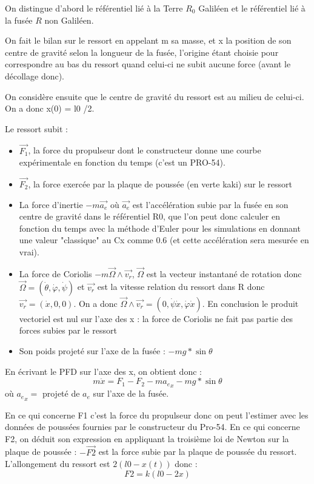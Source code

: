 \documentclass[a4paper,12pt]{scrartcl}
\begin{document}
On distingue d'abord le référentiel lié à la Terre $R_0$ Galiléen et le référentiel lié à la fusée $R$ non Galiléen.

On fait le bilan sur le ressort en appelant m sa masse, et x la position de son centre de gravité selon la longueur de la fusée, l'origine étant choisie pour correspondre au bas du ressort quand celui-ci ne subit aucune force (avant le décollage donc).

On considère ensuite que le centre de gravité du ressort est au milieu de celui-ci.
On a donc x(0) = l0 /2. 

Le ressort subit  : 
\begin{itemize}
\item $\vec{F_1}$, la force du propulseur dont le constructeur donne une courbe expérimentale en fonction du temps (c'est un PRO-54).
\item $\vec{F_2}$, la force exercée par la plaque de poussée (en verte kaki) sur le ressort
\item La force d'inertie $-m \vec{a_e}$ où $\vec{a_e}$ est l'accélération subie par la fusée en son centre de gravité dans le référentiel R0, que l'on peut donc calculer en fonction du temps avec la méthode d'Euler pour les simulations en donnant une valeur "classique" au Cx comme 0.6 (et cette accélération sera mesurée en vrai).
\item La force de Coriolis $-m\vec{\Omega} \wedge \vec{v_r}$, $\vec{\Omega}$ est la vecteur instantané de rotation donc $\vec{\Omega} = (\dot{\theta}, \dot{\varphi}, \dot{\psi})$ et $\vec{v_r}$ est la vitesse relation du ressort dans R donc $\vec{v_r} = (\dot{x}, 0, 0)$.
On a donc $\vec{\Omega} \wedge \vec{v_r} = (0, \dot{\psi} \dot{x}, \dot{\varphi} \dot{x})$.
En conclusion le produit vectoriel est nul sur l'axe des x : la force de Coriolis ne fait pas partie des forces subies par le ressort 

\item Son poids projeté sur l'axe de la fusée : $-mg*\sin{\theta}$
\end{itemize}

En écrivant le PFD sur l'axe des x, on obtient donc : $$ m\ddot{x} = F_1 - F_2 -m{a_e}_x -mg*\sin{\theta}$$ où ${a_e}_x =$ projeté de $a_e$ sur l'axe de la fusée.

En ce qui concerne F1 c'est la force du propulseur donc on peut l'estimer avec les données de poussées fournies par le constructeur du Pro-54.
En ce qui concerne F2, on déduit son expression en appliquant la troisième loi de Newton sur la plaque de poussée : $-\vec{F2}$ est la force subie par la plaque de poussée du ressort. L'allongement du ressort est $2(l0-x(t))$ donc :
$$F2 = k(l0-2x)$$
\end{document}
